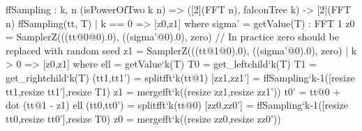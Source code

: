  \begin{algorithm}[!htb]
  \caption{$\ffsampling_{\ n}(\vect, \tree)$}\label{alg:ffsampling}
 \begin{algorithmic}[1]
  \label{line:samplerz0}
  \label{line:samplerz1}
  \EndIf
  \end{algorithmic}
 \end{algorithm}

\begin{code}
  ffSampling : {k, n} (isPowerOfTwo k n) =>
    ([2](FFT n), falconTree k) -> [2](FFT n)
  ffSampling(tt, T)
    | k == 0 => [z0,z1] where
        sigma' = getValue(T) : FFT 1
        z0 = SamplerZ(((tt@0@0).0), ((sigma'@0).0), zero)
        // In practice zero should be replaced with random seed
        z1 = SamplerZ(((tt@1@0).0), ((sigma'@0).0), zero)
    | k >  0 => [z0,z1] where
        ell = getValue`{k}(T)
        T0 = get_leftchild`{k}(T)
        T1 = get_rightchild`{k}(T)
        (tt1,tt1') = splitfft`{k}(tt@1)
        [zz1,zz1'] = ffSampling`{k-1}([resize tt1,resize tt1'],resize T1)
        z1 = mergefft`{k}((resize zz1,resize zz1'))
        t0' = tt@0 + dot (tt@1 - z1) ell
        (tt0,tt0') = splitfft`{k}(tt@0)
        [zz0,zz0'] = ffSampling`{k-1}([resize tt0,resize tt0'],resize T0)
        z0 = mergefft`{k}((resize zz0,resize zz0'))
\end{code}

